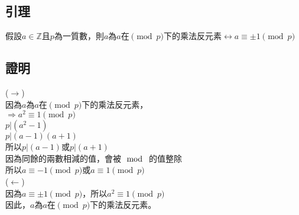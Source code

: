 \documentclass{article}
\begin{document}
{\begin{CJK*}{UTF8}{bkai}
\begin{tcolorbox}[enhanced jigsaw,colback=bg,boxrule=0pt,arc=0pt]
\section*{引理}
假設$a\in\mathbb{Z}$且$p$為一質數，則$a$為$a$在$\pmod {p} $下的乘法反元素$\leftrightarrow a\equiv \pm1\pmod {p} $
\subsection*{證明}
($\rightarrow $)\\
因為$a$為$a$在$\pmod {p} $下的乘法反元素，\\
$\Rightarrow a^2\equiv1\pmod {p} $\\
$p|(a^2-1)$\\
$p|(a-1)(a+1)$\\
所以$p|(a-1)$或$p|(a+1)$\\
因為同餘的兩數相減的值，會被$\mod$ 的值整除\\
所以$a\equiv -1\pmod {p} $或$a\equiv 1\pmod {p} $\\
($\leftarrow$)\\
因為$a\equiv\pm1\pmod {p} $，所以$a^2\equiv1\pmod {p} $\\
因此，$a$為$a$在$\pmod {p} $下的乘法反元素。
\end{tcolorbox}




\end{CJK*}
}
\end{document}
